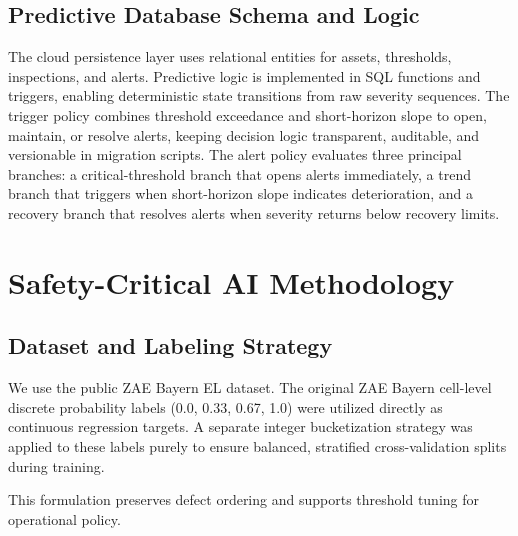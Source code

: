 \documentclass[journal]{IEEEtran}
\begin{document}
\subsection{Predictive Database Schema and Logic}
The cloud persistence layer uses relational entities for assets, thresholds, inspections, and alerts. Predictive logic is implemented in SQL functions and triggers, enabling deterministic state transitions from raw severity sequences. The trigger policy combines threshold exceedance and short-horizon slope to open, maintain, or resolve alerts, keeping decision logic transparent, auditable, and versionable in migration scripts. The alert policy evaluates three principal branches: a critical-threshold branch that opens alerts immediately, a trend branch that triggers when short-horizon slope indicates deterioration, and a recovery branch that resolves alerts when severity returns below recovery limits.

\section{Safety-Critical AI Methodology}\label{sec:methodology}

\subsection{Dataset and Labeling Strategy}
We use the public ZAE Bayern EL dataset. The original ZAE Bayern cell-level discrete probability labels (0.0, 0.33, 0.67, 1.0) were utilized directly as continuous regression targets. A separate integer bucketization strategy was applied to these labels purely to ensure balanced, stratified cross-validation splits during training.

This formulation preserves defect ordering and supports threshold tuning for operational policy.
\end{document}
